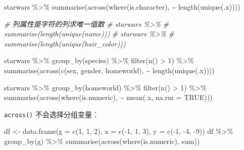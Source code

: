 \documentclass[
]{book}
\newenvironment{Shaded}{\begin{snugshade}}{\end{snugshade}}
\newcommand{\AttributeTok}[1]{\textcolor[rgb]{0.77,0.63,0.00}{#1}}
\newcommand{\CommentTok}[1]{\textcolor[rgb]{0.56,0.35,0.01}{\textit{#1}}}
\newcommand{\ConstantTok}[1]{\textcolor[rgb]{0.00,0.00,0.00}{#1}}
\newcommand{\DecValTok}[1]{\textcolor[rgb]{0.00,0.00,0.81}{#1}}
\newcommand{\FunctionTok}[1]{\textcolor[rgb]{0.00,0.00,0.00}{#1}}
\newcommand{\NormalTok}[1]{#1}
\newcommand{\OtherTok}[1]{\textcolor[rgb]{0.56,0.35,0.01}{#1}}
\newcommand{\SpecialCharTok}[1]{\textcolor[rgb]{0.00,0.00,0.00}{#1}}
\begin{document}
\begin{Shaded}
\begin{Highlighting}[]
\NormalTok{starwars }\SpecialCharTok{\%\textgreater{}\%} 
  \FunctionTok{summarise}\NormalTok{(}\FunctionTok{across}\NormalTok{(}\FunctionTok{where}\NormalTok{(is.character), }\SpecialCharTok{\textasciitilde{}} \FunctionTok{length}\NormalTok{(}\FunctionTok{unique}\NormalTok{(.x))))}

\CommentTok{\# 列属性是字符的列求唯一值数}
\CommentTok{\# starwars \%\textgreater{}\% }
\CommentTok{\#   summarise(length(unique(name)))}
\CommentTok{\# starwars \%\textgreater{}\% }
\CommentTok{\#   summarise(length(unique(hair\_color)))}

\NormalTok{starwars }\SpecialCharTok{\%\textgreater{}\%} 
  \FunctionTok{group\_by}\NormalTok{(species) }\SpecialCharTok{\%\textgreater{}\%} 
  \FunctionTok{filter}\NormalTok{(}\FunctionTok{n}\NormalTok{() }\SpecialCharTok{\textgreater{}} \DecValTok{1}\NormalTok{) }\SpecialCharTok{\%\textgreater{}\%} 
  \FunctionTok{summarise}\NormalTok{(}\FunctionTok{across}\NormalTok{(}\FunctionTok{c}\NormalTok{(sex, gender, homeworld), }\SpecialCharTok{\textasciitilde{}} \FunctionTok{length}\NormalTok{(}\FunctionTok{unique}\NormalTok{(.x))))}

\NormalTok{starwars }\SpecialCharTok{\%\textgreater{}\%} 
  \FunctionTok{group\_by}\NormalTok{(homeworld) }\SpecialCharTok{\%\textgreater{}\%} 
  \FunctionTok{filter}\NormalTok{(}\FunctionTok{n}\NormalTok{() }\SpecialCharTok{\textgreater{}} \DecValTok{1}\NormalTok{) }\SpecialCharTok{\%\textgreater{}\%} 
  \FunctionTok{summarise}\NormalTok{(}\FunctionTok{across}\NormalTok{(}\FunctionTok{where}\NormalTok{(is.numeric), }\SpecialCharTok{\textasciitilde{}} \FunctionTok{mean}\NormalTok{(.x, }\AttributeTok{na.rm =} \ConstantTok{TRUE}\NormalTok{)))}
\end{Highlighting}
\end{Shaded}

\texttt{across()} 不会选择分组变量：

\begin{Shaded}
\begin{Highlighting}[]
\NormalTok{df }\OtherTok{\textless{}{-}} \FunctionTok{data.frame}\NormalTok{(}\AttributeTok{g =} \FunctionTok{c}\NormalTok{(}\DecValTok{1}\NormalTok{, }\DecValTok{1}\NormalTok{, }\DecValTok{2}\NormalTok{), }\AttributeTok{x =} \FunctionTok{c}\NormalTok{(}\SpecialCharTok{{-}}\DecValTok{1}\NormalTok{, }\DecValTok{1}\NormalTok{, }\DecValTok{3}\NormalTok{), }\AttributeTok{y =} \FunctionTok{c}\NormalTok{(}\SpecialCharTok{{-}}\DecValTok{1}\NormalTok{, }\SpecialCharTok{{-}}\DecValTok{4}\NormalTok{, }\SpecialCharTok{{-}}\DecValTok{9}\NormalTok{))}
\NormalTok{df }\SpecialCharTok{\%\textgreater{}\%} 
  \FunctionTok{group\_by}\NormalTok{(g) }\SpecialCharTok{\%\textgreater{}\%} 
  \FunctionTok{summarise}\NormalTok{(}\FunctionTok{across}\NormalTok{(}\FunctionTok{where}\NormalTok{(is.numeric), sum))}
\end{Highlighting}
\end{Shaded}
\end{document}
